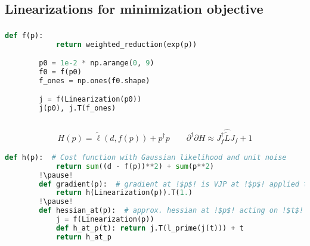 \documentclass[aspectratio=169,xcolor=dvipsnames]{beamer}
\begin{document}
\subsection{Linearizations for minimization objective}
\begin{frame}[fragile]
	\frametitle{\insertsection}
	\framesubtitle{\insertsubsection}

	\begin{lstlisting}[language=python,escapechar=!]
		def f(p):
			return weighted_reduction(exp(p))

		p0 = 1e-2 * np.arange(0, 9)
		f0 = f(p0)
		f_ones = np.ones(f0.shape)

		j = f(Linearization(p0))
		j(p0), j.T(f_ones)
	\end{lstlisting}

\end{frame}

\begin{frame}[fragile]
	\frametitle{\insertsection}
	\framesubtitle{\insertsubsection}

	\begin{align*}
		H(p) = \tilde{\ell}(d, f(p)) + p^\dagger p \quad\quad \partial^\dagger \partial H \approx J_{f}^\dagger \widehat{\tilde{L}} J_{f} + 1
	\end{align*}

	\vspace{1em}
	\begin{lstlisting}[language=python,escapechar=!]
		def h(p):  # Cost function with Gaussian likelihood and unit noise
			return sum((d - f(p))**2) + sum(p**2)
		!\pause!
		def gradient(p):  # gradient at !$p$! is VJP at !$p$! applied to 1.
			return h(Linearization(p)).T(1.)
		!\pause!
		def hessian_at(p):  # approx. hessian at !$p$! acting on !$t$!
			j = f(Linearization(p))
			def h_at_p(t): return j.T(l_prime(j(t))) + t
			return h_at_p
	\end{lstlisting}

\end{frame}
\end{document}
